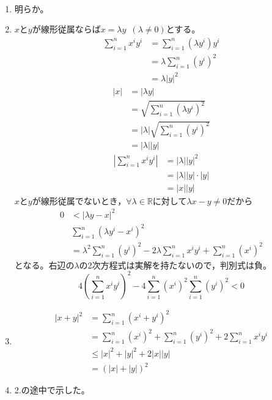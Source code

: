 \documentclass[dvipdfmx,a4j,10pt]{jsarticle}
\makeatletter
\theoremstyle{mystyle1}
\theoremstyle{mystyle2}
\renewenvironment{proof}[1][\proofname]{\par
  \pushQED{\qed}%
  \normalfont
  \topsep6\p@\@plus6\p@ \trivlist
  \item[\hskip\labelsep{\bfseries\sffamily #1}]\ignorespaces
}{%
  \popQED\endtrivlist\@endpefalse
}
\renewcommand\proofname{証明}
\makeatother
\begin{document}
\begin{proof}　
\begin{enumerate}
	\item 明らか。
	\item $x$と$y$が線形従属ならば$x=\lambda y$\ $(\lambda\neq0)$とする。
	\[
	\begin{split}
	\sum_{i=1}^n x^iy^i &= \sum_{i=1}^n(\lambda y^i)y^i\\
	&=\lambda\sum_{i=1}^n(y^i)^2\\
	&=\lambda|y|^2
	\end{split}
	\]
	\[
	\begin{split}
	|x|&=|\lambda y|\\
	&=\sqrt{\sum_{i=1}^n(\lambda y^i)^2}\\
	&=|\lambda|\sqrt{\sum_{i=1}^n(y^i)^2}\\
	&=|\lambda||y|
	\end{split}
	\]
	\[
	\begin{split}
	\left|\sum_{i=1}^nx^iy^i\right|&=|\lambda||y|^2\\
	&=|\lambda||y|\cdot|y|\\
	&=|x||y|
	\end{split}
	\]
	$x$と$y$が線形従属でないとき，$\forall\lambda\in\mathbb{R}$に対して$\lambda x-y\neq0$だから
	\[
	\begin{split}
		0&<|\lambda y-x|^2\\
		&\sum_{i=1}^n(\lambda y^i-x^i)^2\\
		&=\lambda^2\sum_{i=1}^n(y^i)^2-2\lambda\sum_{i=1}^nx^iy^i+\sum_{i=1}^n(x^i)^2
	\end{split}
	\]
	となる。右辺の$\lambda$の2次方程式は実解を持たないので，判別式は負。
	\[
	4\left(\sum_{i=1}^nx^iy^i\right)^2-4 \sum_{i=1}^n(x^i)^2 \sum_{i=1}^n(y^i)^2<0
	\]
	\item
	\[
	\begin{split}
	|x+y|^2&=\sum_{i=1}^n(x^i+y^i)^2\\
	&=\sum_{i=1}^n(x^i)^2+\sum_{i=1}^n(y^i)^2+2\sum_{i=1}^nx^iy^i\\
	&\leq|x|^2+|y|^2+2|x||y|\\
	&=(|x|+|y|)^2
    \end{split}
	\]
	\item 2.の途中で示した。
\end{enumerate}
\end{proof}

\newpage
\end{document}
